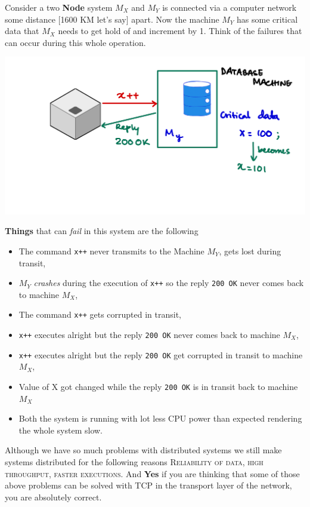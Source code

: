 \noindent Consider a two \textbf{Node} system $M_X$ and $M_Y$ is connected via a computer network some distance [1600 KM let's say] apart. Now the machine $M_Y$ has some critical data that $M_X$ needs to get hold of and increment by 1. Think of the failures that can occur during this whole operation.

\includegraphics[scale=0.15]{images/img1.jpeg}

\noindent \textbf{Things} that can \textit{fail} in this system are the following
\begin{itemize}
    \item The command \texttt{x++} never transmits to the Machine $M_Y$, gets lost during transit,
    \item $M_Y$ \textit{crashes} during the execution of \texttt{x++} so the reply \texttt{200 OK} never comes back to machine $M_X$,
    \item The command \texttt{x++} gets corrupted in transit,
    \item \texttt{x++} executes alright but the reply \texttt{200 OK} never comes back to machine $M_X$,
    \item \texttt{x++} executes alright but the reply \texttt{200 OK} get corrupted in transit to machine $M_X$,
    \item Value of X got changed while the reply \texttt{200 OK} is in transit back to machine $M_X$
    \item Both the system is running with lot less CPU power than expected rendering the whole system slow.
\end{itemize}

\noindent Although we have so much problems with distributed systems we still make systems distributed for the following reasons \textsc{Reliability of data, high throughput, faster executions}. And \textbf{Yes} if you are thinking that some of those above problems can be solved with TCP in the transport layer of the network, you are absolutely correct.


